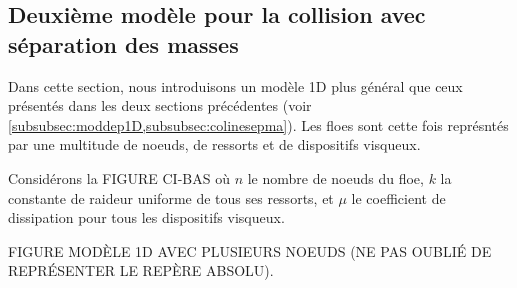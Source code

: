 







\subsection{Deuxième modèle pour la collision avec séparation des masses}
\label{subsec:model1d2}



Dans cette section, nous introduisons un modèle 1D plus général que ceux présentés dans les deux sections précédentes (voir \cref{subsubsec:moddep1D,subsubsec:colinesepma}). Les floes sont cette fois représntés par une multitude de noeuds, de ressorts et de dispositifs visqueux. 

Considérons la FIGURE CI-BAS où $n$ le nombre de noeuds du floe, $k$ la constante de raideur uniforme de tous ses ressorts, et $\mu$ le coefficient de dissipation pour tous les dispositifs visqueux. 

FIGURE MODÈLE 1D AVEC PLUSIEURS NOEUDS (NE PAS OUBLIÉ DE REPRÉSENTER LE REPÈRE ABSOLU).


